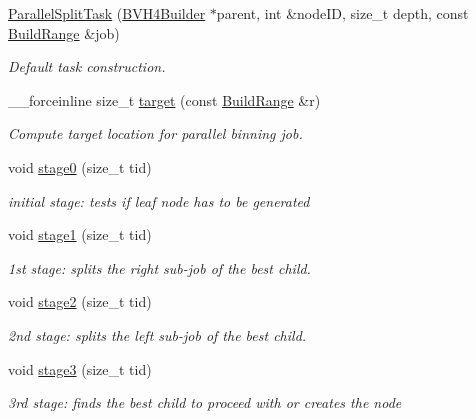 \begin{DoxyCompactItemize}
\item 
\hyperlink{classembree_1_1_b_v_h4_builder_1_1_parallel_split_task_a48d106b9c363aab0d89a0e7ba2f1d973}{ParallelSplitTask} (\hyperlink{classembree_1_1_b_v_h4_builder}{BVH4Builder} $\ast$parent, int \&nodeID, size\_\-t depth, const \hyperlink{structembree_1_1_build_range}{BuildRange} \&job)
\begin{DoxyCompactList}\small\item\em Default task construction. \item\end{DoxyCompactList}\item 
\_\-\_\-forceinline size\_\-t \hyperlink{classembree_1_1_b_v_h4_builder_1_1_parallel_split_task_a7e7213c44791d45fed9dc067df571991}{target} (const \hyperlink{structembree_1_1_build_range}{BuildRange} \&r)
\begin{DoxyCompactList}\small\item\em Compute target location for parallel binning job. \item\end{DoxyCompactList}\item 
void \hyperlink{classembree_1_1_b_v_h4_builder_1_1_parallel_split_task_a9bbc20b1eaced467e1215538a7c29dae}{stage0} (size\_\-t tid)
\begin{DoxyCompactList}\small\item\em initial stage: tests if leaf node has to be generated \item\end{DoxyCompactList}\item 
void \hyperlink{classembree_1_1_b_v_h4_builder_1_1_parallel_split_task_a8c0ea23a31dc2336d305bd58273f98d7}{stage1} (size\_\-t tid)
\begin{DoxyCompactList}\small\item\em 1st stage: splits the right sub-\/job of the best child. \item\end{DoxyCompactList}\item 
void \hyperlink{classembree_1_1_b_v_h4_builder_1_1_parallel_split_task_a8a68218be4327a524a96e0b6abf4f0ac}{stage2} (size\_\-t tid)
\begin{DoxyCompactList}\small\item\em 2nd stage: splits the left sub-\/job of the best child. \item\end{DoxyCompactList}\item 
void \hyperlink{classembree_1_1_b_v_h4_builder_1_1_parallel_split_task_ad1ab8b17aa8ad5ea0a9479a218450973}{stage3} (size\_\-t tid)
\begin{DoxyCompactList}\small\item\em 3rd stage: finds the best child to proceed with or creates the node \item\end{DoxyCompactList}\end{DoxyCompactItemize}
